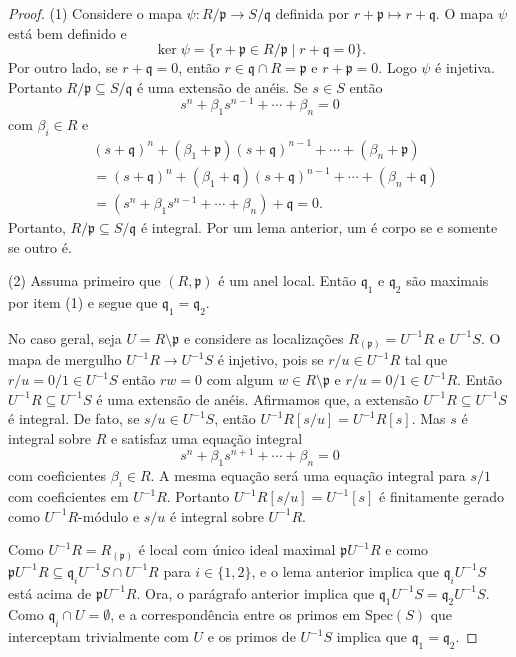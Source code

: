 \documentclass[12pt]{amsart}
\newcommand{\p}{\mathfrak p}
\newcommand{\q}{\mathfrak q}
\newcommand{\spec}[1]{\mbox{Spec}(#1)}
\begin{document}
\begin{proof}
    (1) Considere o mapa $\psi:R/\p\to S/\q$ definida por $r+\p\mapsto r+\q$. 
    O mapa $\psi$ está bem definido e 
    \[
        \ker\psi=\{r+\p\in R/\p\mid r+\q=0\}.
    \]
    Por outro lado, se $r+\q=0$, então $r\in \q\cap R=\p$ e $r+\p=0$. Logo $\psi$ é injetiva.
    Portanto $R/\p\subseteq S/\q$
    é uma extensão  de anéis. Se $s\in S$ então 
    \[
        s^n+\beta_1s^{n-1}+\cdots+\beta_n=0
    \]    
    com $\beta_i\in R$ e 
    \begin{align*}
        &(s+\q)^n+(\beta_1+\p)(s+\q)^{n-1}+\cdots+(\beta_n+\p)\\&=
        (s+\q)^n+(\beta_1+\q)(s+\q)^{n-1}+\cdots+(\beta_n+\q)\\&=
        (s^n+\beta_1s^{n-1}+\cdots+\beta_n)+\q=0.
    \end{align*}    
    Portanto, $R/\p\subseteq S/\q$ é integral.
    Por um lema anterior, um é corpo se e somente se outro é.

    (2) Assuma primeiro que $(R,\p)$ é um anel local. Então $\q_1$ e $\q_2$ são maximais
    por item (1)
    e segue que $\q_1=\q_2$. 
    
    No caso geral, seja $U=R\setminus\p$ e considere as localizações $R_{(\p)}=U^{-1}R$ e 
    $U^{-1}S$.  O mapa de mergulho $U^{-1}R\to U^{-1}S$ é injetivo, pois se $r/u\in U^{-1}R$ tal que 
    $r/u=0/1\in U^{-1}S$ então 
    $rw=0$ com algum $w\in R\setminus \p$ e $r/u=0/1\in U^{-1}R$. Então $U^{-1}R\subseteq U^{-1}S$ é 
    uma extensão de anéis. Afirmamos que, 
    a extensão $U^{-1}R\subseteq U^{-1}S$ é integral. De fato, se $s/u\in U^{-1}S$, então 
    $U^{-1}R[s/u]=U^{-1}R[s]$. Mas $s$ é integral sobre $R$ e satisfaz uma equação integral 
    \[
        s^n+\beta_1s^{n+1}+\cdots+\beta_n=0
    \]
    com coeficientes $\beta_i\in R$. A mesma equação será uma equação integral para $s/1$ com coeficientes em $U^{-1}R$. Portanto $U^{-1}R[s/u]=
    U^{-1}[s]$ é finitamente gerado como $U^{-1}R$-módulo e $s/u$ é integral sobre $U^{-1}R$. 
    
    Como $U^{-1}R=R_{(\p)}$ é local com único ideal maximal $\p U^{-1}R$ e como  
    $\p U^{-1}R\subseteq \q_i U^{-1}S\cap U^{-1}R$ para $i\in\{1,2\}$, 
    e o lema anterior implica que $\q_i U^{-1}S$ está acima de $\p U^{-1}R$.  
    Ora, o parágrafo anterior implica que $\q_1U^{-1}S=\q_2U^{-1}S$. Como $\q_i\cap U=\emptyset$,  
    e a correspondência entre os primos em 
    $\spec S$ que interceptam trivialmente com $U$ e os primos de $U^{-1}S$ implica que $\q_1=\q_2$.
    

\end{proof}
\end{document}
